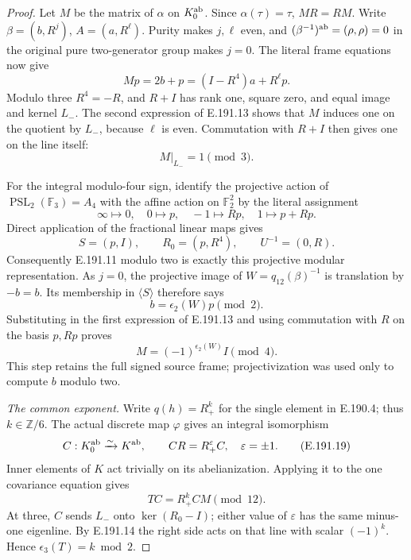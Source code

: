 \begin{proof}
Let \(M\) be the matrix of \(\alpha\) on
\(K_0^{\rm ab}\).  Since \(\alpha(\tau)=\tau\),
\(MR=RM\).  Write
\(\beta=(b,R^j)\), \(A=(a,R^\ell)\).
Purity makes \(j,\ell\) even, and
\((\beta^{-1})^{\rm ab}=(\rho,\rho)=0\)
in the original pure two-generator group
makes \(j=0\).  The literal frame equations
now give
\[
          Mp=2b+p=(I-R^4)a+R^\ell p .
\tag{E.191.13}
\]
Modulo three \(R^4=-R\), and \(R+I\)
has rank one, square zero, and equal image
and kernel \(L_-\).  The second expression
of E.191.13 shows that \(M\) induces one
on the quotient by \(L_-\), because
\(\ell\) is even.  Commutation with \(R+I\)
then gives one on the line itself:
\[
                         M|_{L_-}=1\pmod3 .
\tag{E.191.14}
\]

For the integral modulo-four sign, identify
the projective action of
\(\operatorname{PSL}_2(\mathbb F_3)=A_4\)
with the affine action on \(\mathbb F_2^2\)
by the literal assignment
\[
 \infty\mapsto0,\quad 0\mapsto p,\quad
 -1\mapsto Rp,\quad 1\mapsto p+Rp .
\tag{E.191.15}
\]
Direct application of the fractional linear
maps gives
\[
             S=(p,I),\qquad R_0=(p,R^4),
                       \qquad U^{-1}=(0,R).
\tag{E.191.16}
\]
Consequently E.191.11 modulo two is exactly
this projective modular representation.
As \(j=0\), the projective image of
\(W=q_{12}(\beta)^{-1}\) is translation by
\(-b=b\).  Its membership in \(\langle S\rangle\)
therefore says
\[
                        b=\epsilon_2(W)p\pmod2 .
\tag{E.191.17}
\]
Substituting in the first expression of
E.191.13 and using commutation with \(R\)
on the basis \(p,Rp\) proves
\[
                         M=(-1)^{\epsilon_2(W)}I\pmod4 .
\tag{E.191.18}
\]
This step retains the full signed source
frame; projectivization was used only to
compute \(b\) modulo two.

\emph{The common exponent.}
Write \(q(h)=R_+^k\) for the single element
in E.190.4; thus \(k\in\mathbb Z/6\).
The actual discrete map \(\varphi\) gives
an integral isomorphism
\[
 C:K_0^{\rm ab}\xrightarrow{\sim}K^{\rm ab},
           \qquad CR=R_+^\varepsilon C,
                       \quad\varepsilon=\pm1 .
\tag{E.191.19}
\]
Inner elements of \(K\) act trivially on
its abelianization.  Applying it to the
one covariance equation gives
\[
                          TC=R_+^k CM\pmod{12}.
\tag{E.191.20}
\]
At three, \(C\) sends \(L_-\) onto
\(\ker(R_0-I)\); either value of
\(\varepsilon\) has the same minus-one
eigenline.  By E.191.14 the right side
acts on that line with scalar \((-1)^k\).
Hence \(\epsilon_3(T)=k\bmod2\).


\end{proof}
